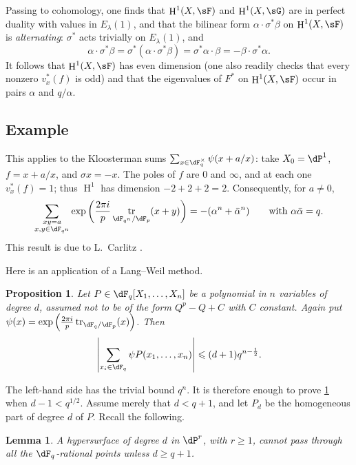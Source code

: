 \documentclass[12pt,oneside,english]{smfbook}
\DeclareMathOperator{\h}{H}
\DeclareMathOperator{\tr}{tr}
\newtheorem{lemma_}[subsection]{Lemma}
\newtheorem{proposition_}[subsection]{Proposition}
\begin{document}
Passing to cohomology, one finds that $\h^1(X,\sF)$ and $\h^1(X,\sG)$ are in perfect duality with values in $E_\lambda(1)$, and that the bilinear form $\alpha\cdot\sigma^\ast\beta$ on $\h^1(X,\sF)$ is \emph{alternating}: $\sigma^\ast$ acts trivially on $E_\lambda(1)$, and
\[
  \alpha\cdot \sigma^\ast \beta = \sigma^\ast(\alpha\cdot \sigma^\ast \beta) = \sigma^\ast \alpha\cdot \beta = -\beta\cdot \sigma^\ast \alpha \text{.}
\]
It follows that $\h^1(X,\sF)$ has even dimension (one also readily checks that every nonzero $v_x^\ast(f)$ is odd) and that the eigenvalues of $F^\ast$ on $\h^1(X,\sF)$ occur in pairs $\alpha$ and $q/\alpha$.

\subsection{Example}\label{VI:3-7}

This applies to the Kloosterman sums $\sum_{x\in\dF_q^\times}\psi(x+a/x)$: take $X_0=\dP^1$, $f=x+a/x$, and $\sigma x=-x$. The poles of $f$ are $0$ and $\infty$, and at each one $v_x^\ast(f)=1$; thus $\h^1$ has dimension $-2+2+2=2$. Consequently, for $a\ne0$,
\[
  \sum_{\substack{x y=a \\ x,y\in \dF_{q^n}}}
  \exp\left(\frac{2\pi i}{p}
  \tr_{\dF_{q^n}/\dF_p}(x+y)\right)
  =-(\alpha^n+\bar\alpha^n)
  \qquad\text{with }\alpha\bar\alpha=q \text{.}
\]
This result is due to L.\ Carlitz \cite{ca69}.

Here is an application of a Lang--Weil method.

\begin{proposition_}\label{VI:3-8}
Let $P\in\dF_q[X_1,\dotsc,X_n]$ be a polynomial in $n$ variables of degree $d$, assumed not to be of the form $Q^p-Q+C$ with $C$ constant. Again put $\psi(x)=\exp\left(\frac{2\pi i}{p}\tr_{\dF_q/\dF_p}(x)\right)$. Then
\[
  \left|\sum_{x_i\in \dF_q} \psi P(x_1,\dots,x_n)\right| \leqslant (d+1) q^{n-\frac 1 2} \text{.}
\]
\end{proposition_}

The left-hand side has the trivial bound $q^n$. It is therefore enough to prove \ref{VI:3-8} when $d-1<q^{1/2}$. Assume merely that $d<q+1$, and let $P_d$ be the homogeneous part of degree $d$ of $P$. Recall the following.

\begin{lemma_}\label{VI:3-9}
A hypersurface of degree $d$ in $\dP^r$, with $r\geqslant1$, cannot pass through all the $\dF_q$-rational points unless $d\geqslant q+1$.
\end{lemma_}
\end{document}
